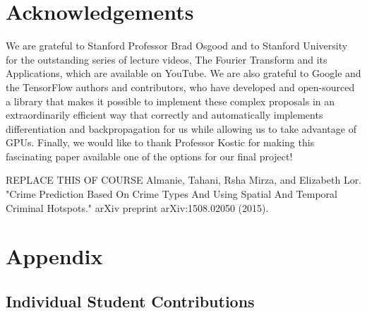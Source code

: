 \documentclass[10pt,journal,compsoc]{IEEEtran}
\begin{document}
\section{Acknowledgements}

We are grateful to Stanford Professor Brad Osgood and to Stanford University for the outstanding series of lecture videos, The Fourier Transform and its Applications, which are available on YouTube. We are also grateful to Google and the TensorFlow authors and contributors, who have developed and open-sourced a library that makes it possible to implement these complex proposals in an extraordinarily efficient way that correctly and automatically implements differentiation and backpropagation for us while allowing us to take advantage of GPUs. Finally, we would like to thank Professor Kostic for making this fascinating paper available one of the options for our final project!


\begin{thebibliography}{1}

REPLACE THIS OF COURSE Almanie, Tahani, Rsha Mirza, and Elizabeth Lor. "Crime Prediction Based On Crime Types And Using Spatial And Temporal Criminal Hotspots." arXiv preprint arXiv:1508.02050 (2015).\\

\end{thebibliography}

\section{Appendix}

\subsection{Individual Student Contributions}
\end{document}
